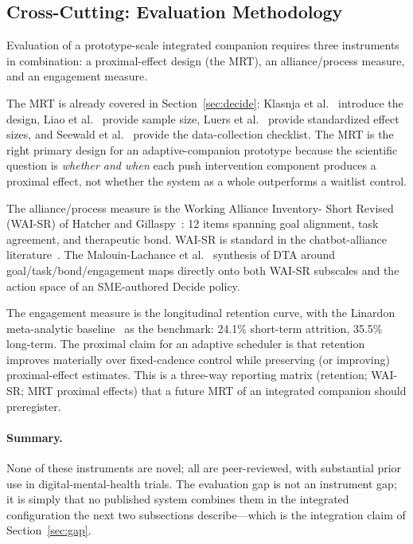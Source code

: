 \documentclass[11pt,a4paper]{article}
\newcommand{\secref}[1]{Section~\ref{#1}}
\begin{document}
\subsection{Cross-Cutting: Evaluation Methodology}\label{sec:evaluation}

Evaluation of a prototype-scale integrated companion requires three
instruments in combination: a proximal-effect design (the MRT), an
alliance/process measure, and an engagement measure.

The MRT is already covered in \secref{sec:decide}: Klasnja et
al.~\cite{Klasnja2015MRT} introduce the design, Liao et
al.~\cite{Liao2016MRTSampleSize} provide sample size, Luers et
al.~\cite{Luers2018StandardizedEffect} provide standardized effect
sizes, and Seewald et al.~\cite{Seewald2019MRTData} provide the
data-collection checklist. The MRT is the right primary design for
an adaptive-companion prototype because the scientific question is
\emph{whether and when} each push intervention component produces
a proximal effect, not whether the system as a whole outperforms a
waitlist control.

The alliance/process measure is the Working Alliance Inventory-
Short Revised (WAI-SR) of Hatcher and Gillaspy~\cite{Hatcher2006WAISR}:
12 items spanning goal alignment, task agreement, and therapeutic
bond. WAI-SR is standard in the chatbot-alliance
literature~\cite{Henson2019DTA,Lederman2021DTASpecialIssue,MalouinLachance2025DTAReview}.
The Malouin-Lachance et al.~\cite{MalouinLachance2025DTAReview}
synthesis of DTA around goal/task/bond/engagement maps directly
onto both WAI-SR subscales and the action space of an SME-authored
Decide policy.

The engagement measure is the longitudinal retention curve, with
the Linardon meta-analytic
baseline~\cite{Linardon2020Attrition} as the benchmark: 24.1\%
short-term attrition, 35.5\% long-term. The proximal claim for an
adaptive scheduler is that retention improves materially over
fixed-cadence control while preserving (or improving) proximal-effect
estimates. This is a three-way reporting matrix (retention; WAI-SR;
MRT proximal effects) that a future MRT of an integrated companion
should preregister.

\paragraph{Summary.} None of these instruments are novel; all are
peer-reviewed, with substantial prior use in digital-mental-health
trials. The evaluation gap is not an instrument gap; it is simply
that no published system combines them in the integrated
configuration the next two subsections describe---which is the
integration claim of \secref{sec:gap}.
\end{document}
